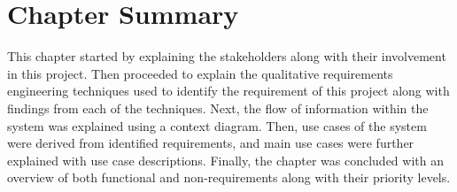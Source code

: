 \section{Chapter Summary}
This chapter started by explaining the stakeholders along with their involvement in this project. Then proceeded to explain the qualitative requirements engineering techniques used to identify the requirement of this project along with findings from each of the techniques. Next, the flow of information within the system was explained using a context diagram. Then, use cases of the system were derived from identified requirements, and main use cases were further explained with use case descriptions. Finally, the chapter was concluded with an overview of both functional and non-requirements along with their priority levels.